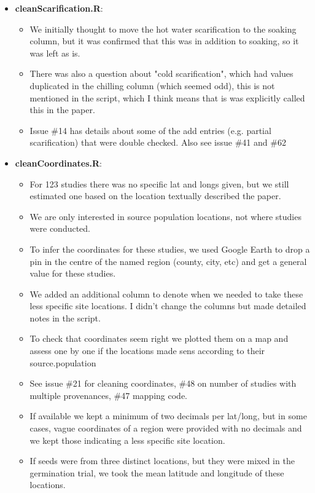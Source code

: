 \documentclass{article}[12pt]
\begin{document}
\begin{enumerate}
\begin{itemize}
\item \textbf{cleanScarification.R}: 
\begin{itemize}
\item We initially thought to move the hot water scarification to the soaking column, but it was confirmed that this was in addition to soaking, so it was left as is. 
\item There was also a question about "cold scarification", which had values duplicated in the chilling column (which seemed odd), this is not mentioned in the script, which I think means that is was explicitly called this in the paper. 
\item Issue \#14 has details about some of the add entries (e.g. partial scarification) that were double checked.  Also see issue \#41 and \#62
\end{itemize}
\item \textbf{cleanCoordinates.R}: 
\begin{itemize}
\item For 123 studies there was no specific lat and longs given, but we still estimated one based on the location textually described the paper. 
\item We are only interested in source population locations, not where studies were conducted. 
\item To infer the coordinates for these studies, we used Google Earth to drop a pin in the centre of the named region (county, city, etc) and get a general value for these studies. 
\item We added an additional column to denote when we needed to take these less specific site locations. I didn't change the columns but made detailed notes in the script. 
\item To check that coordinates seem right we plotted them on a map and assess one by one if the locations made sens according to their source.population
\item See issue \#21 for cleaning coordinates, \#48 on number of studies with multiple provenances, \#47 mapping code.
\item If available we kept a minimum of two decimals per lat/long, but in some cases, vague coordinates of a region were provided with no decimals and we kept those indicating a less specific site location. 
\item If seeds were from three distinct locations, but they were mixed in the germination trial, we took the mean latitude and longitude of these locations. 
\end{itemize}

\end{itemize}
\end{enumerate}
\end{document}
